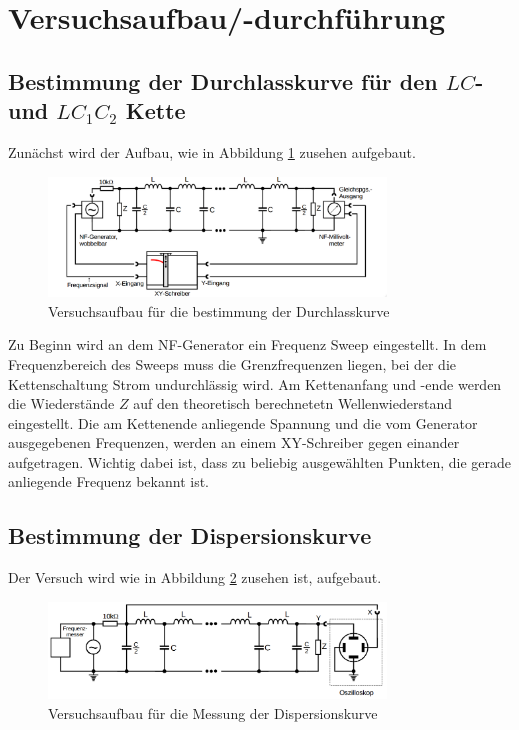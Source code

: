 \section{Versuchsaufbau/-durchführung}

\subsection{Bestimmung der Durchlasskurve für den $LC$- und $LC_1 C_2$ Kette}
Zunächst wird der Aufbau, wie in Abbildung \ref{fig:aufbau_durchlass} zusehen aufgebaut.
\begin{figure}
  \centering
  \includegraphics[width=0.8\textwidth]{bilder/versuchsaufbau_1.png}
  \caption{Versuchsaufbau für die bestimmung der Durchlasskurve}
  \label{fig:aufbau_durchlass}
\end{figure}

Zu Beginn wird an dem NF-Generator ein Frequenz Sweep eingestellt.
In dem Frequenzbereich des Sweeps muss die Grenzfrequenzen liegen, bei der die 
Kettenschaltung Strom undurchlässig wird.
Am Kettenanfang und -ende werden die Wiederstände $Z$ auf den theoretisch 
berechnetetn Wellenwiederstand eingestellt.
Die am Kettenende anliegende Spannung und die vom Generator ausgegebenen Frequenzen, 
werden an einem XY-Schreiber gegen einander aufgetragen.
Wichtig dabei ist, dass zu beliebig ausgewählten Punkten, die gerade anliegende Frequenz bekannt ist. %


\subsection{Bestimmung der Dispersionskurve}
Der Versuch wird wie in Abbildung \ref{fig:aufbau_dispersion} zusehen ist, aufgebaut.
\begin{figure}
  \centering
  \includegraphics[width=0.8\textwidth]{bilder/versuchsaufbau_dispersion.png}
  \caption{Versuchsaufbau für die Messung der Dispersionskurve}
  \label{fig:aufbau_dispersion}
\end{figure}

